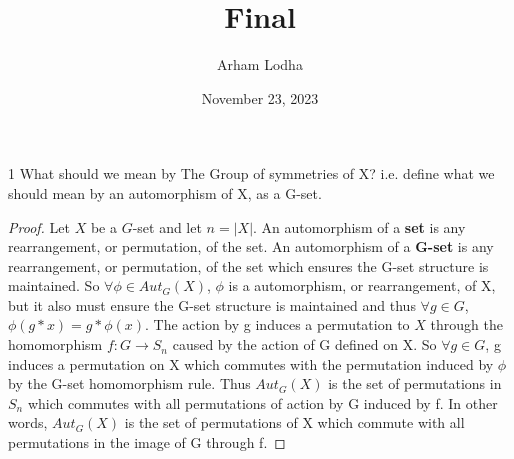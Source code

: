 \documentclass{article}
\begin{document}
\title{Final}
\author{Arham Lodha}%
\date{November 23, 2023}%
\maketitle

\begin{PROB}{1}\label{Problem 1.}
    What should we mean by The Group of symmetries of X? i.e. define what we should mean by an automorphism of X, as a G-set.
\end{PROB}
\begin{proof}
    Let $X$ be a $G$-set and let $n = |X|$. An automorphism of a \textbf{set} is any rearrangement, or permutation, of the set. An automorphism of a \textbf{G-set} is any rearrangement, or permutation, of the set which ensures the G-set structure is maintained. So $\forall \phi \in Aut_G(X)$, $\phi$ is a automorphism, or rearrangement, of X, but it also must ensure the G-set structure is maintained and thus $\forall g\in G$, $\phi(g \ast x) = g \ast \phi(x)$. The action by g induces a permutation to $X$ through the homomorphism $f: G \to S_n$ caused by the action of G defined on X. So $\forall g \in G$, g induces a permutation on X which commutes with the permutation induced by $\phi$ by the G-set homomorphism rule. Thus $Aut_G(X)$ is the set of permutations in $S_n$ which commutes with all permutations of action by G induced by f. In other words, $Aut_G(X)$ is the set of permutations of X which commute with all permutations in the image of G through f.
\end{proof}

\bigskip
\end{document}
